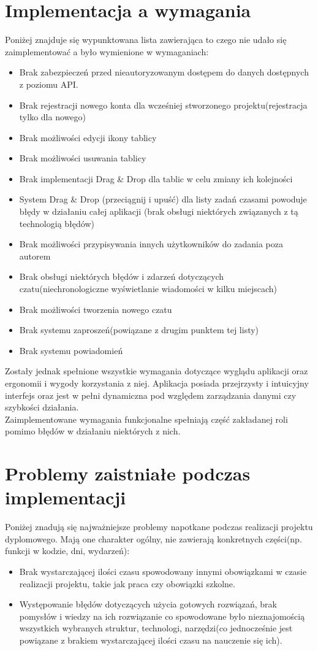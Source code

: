 \documentclass[eng,printmode]{mgr}
\begin{document}
\section{Implementacja a wymagania}
Poniżej znajduje się wypunktowana lista zawierająca to czego nie udało się zaimplementować a było wymienione w wymaganiach:
\begin{itemize}
  \item Brak zabezpieczeń przed nieautoryzowanym dostępem do danych dostępnych z poziomu API.
  \item Brak rejestracji nowego konta dla wcześniej stworzonego projektu(rejestracja tylko dla nowego)
  \item Brak możliwości edycji ikony tablicy
  \item Brak możliwości usuwania tablicy
  \item Brak implementacji Drag \& Drop dla tablic w celu zmiany ich kolejności
  \item System Drag \& Drop (przeciągnij i upuść) dla listy zadań czasami powoduje błędy w działaniu całej aplikacji (brak obsługi niektórych związanych z tą technologią błędów)
  \item Brak możliwości przypisywania innych użytkowników do zadania poza autorem
  \item Brak obsługi niektórych błędów i zdarzeń dotyczących czatu(niechronologiczne wyświetlanie wiadomości w kilku miejscach)
  \item Brak możliwości tworzenia nowego czatu
  \item Brak systemu zaproszeń(powiązane z drugim punktem tej listy)
  \item Brak systemu powiadomień
\end{itemize}
Zostały jednak spełnione wszystkie wymagania dotyczące wyglądu aplikacji oraz ergonomii i wygody korzystania z niej. Aplikacja posiada przejrzysty i intuicyjny interfejs oraz jest w pełni dynamiczna pod względem zarządzania danymi czy szybkości działania. \\
Zaimplementowane wymagania funkcjonalne spełniają część zakładanej roli pomimo błędów w działaniu niektórych z nich.

\section{Problemy zaistniałe podczas implementacji}
Poniżej znadują się najważniejsze problemy napotkane podczas realizacji projektu dyplomowego. Mają one charakter ogólny, nie zawierają konkretnych części(np. funkcji w kodzie, dni, wydarzeń):
\begin{itemize}
  \item Brak wystarczającej ilości czasu spowodowany innymi obowiązkami w czasie realizacji projektu, takie jak praca czy obowiązki szkolne.
  \item Występowanie błędów dotyczących użycia gotowych rozwiązań, brak pomysłów i wiedzy na ich rozwiązanie co spowodowane było nieznajomością wszystkich wybranych struktur, technologi, narzędzi(co jednocześnie jest powiązane z brakiem wystarczającej ilości czasu na nauczenie się ich).
\end{itemize}
\end{document}

